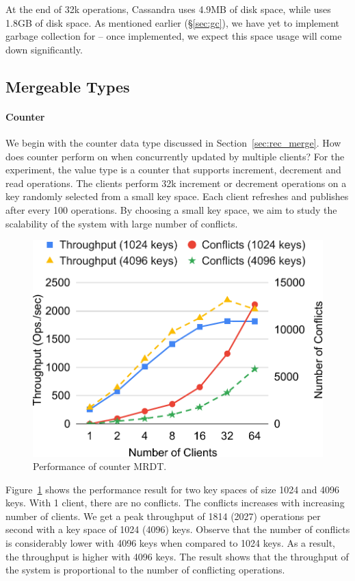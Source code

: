 At the end of 32k operations, Cassandra uses 4.9MB of disk space, while \name
uses 1.8GB of disk space. As mentioned earlier (\S\ref{sec:gc}), we have yet to implement garbage collection for
\name -- once implemented, we expect this space usage will come down significantly.

\subsection{Mergeable Types}

\paragraph*{\textbf{Counter}} We begin with the counter data type discussed in
Section~\ref{sec:rec_merge}. How does \name counter perform on when
concurrently updated by multiple clients? For the experiment, the value type is
a counter that supports increment, decrement and read operations. The clients
perform 32k increment or decrement operations on a key randomly selected from a
small key space. Each client refreshes and publishes after every 100
operations. By choosing a small key space, we aim to study the scalability of
the system with large number of conflicts.

\begin{figure}
	\vspace{-0.5cm}
	\includegraphics[scale=0.45]{results/counter}
	\caption{Performance of counter MRDT.}
	\label{res:counter}
	\vspace{-0.5cm}
\end{figure}
Figure~\ref{res:counter} shows the performance result for two key spaces of
size 1024 and 4096 keys. With 1 client, there are no conflicts. The conflicts
increases with increasing number of clients. We get a peak throughput of 1814
(2027) operations per second with a key space of 1024 (4096) keys. Observe that
the number of conflicts is considerably lower with 4096 keys when compared to
1024 keys. As a result, the throughput is higher with 4096 keys. The result
shows that the throughput of the system is proportional to the number of
conflicting operations.

